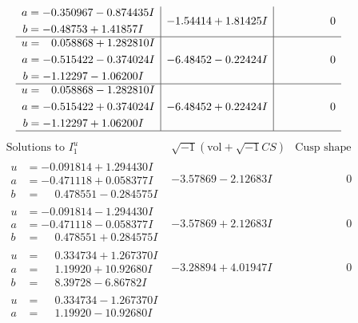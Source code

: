 \documentclass[1p]{elsarticle_modified}
\theoremstyle{definition}
\newcommand{\I}{\sqrt{-1}}
\begin{document}
$$\begin{array}{c|c|c}
\begin{aligned}
a &= -0.350967 - 0.874435 I \\
b &= -0.48753 + 1.41857 I\end{aligned}
 & -1.54414 + 1.81425 I & \phantom{-0.000000 } 0 \\ \hline\begin{aligned}
u &= \phantom{-}0.058868 + 1.282810 I \\
a &= -0.515422 - 0.374024 I \\
b &= -1.12297 - 1.06200 I\end{aligned}
 & -6.48452 - 0.22424 I & \phantom{-0.000000 } 0 \\ \hline\begin{aligned}
u &= \phantom{-}0.058868 - 1.282810 I \\
a &= -0.515422 + 0.374024 I \\
b &= -1.12297 + 1.06200 I\end{aligned}
 & -6.48452 + 0.22424 I & \phantom{-0.000000 } 0\\
 \hline 
 \end{array}$$\newpage$$\begin{array}{c|c|c}  
\text{Solutions to }I^u_{1}& \I (\text{vol} + \sqrt{-1}CS) & \text{Cusp shape}\\
 \hline 
\begin{aligned}
u &= -0.091814 + 1.294430 I \\
a &= -0.471118 + 0.058377 I \\
b &= \phantom{-}0.478551 - 0.284575 I\end{aligned}
 & -3.57869 - 2.12683 I & \phantom{-0.000000 } 0 \\ \hline\begin{aligned}
u &= -0.091814 - 1.294430 I \\
a &= -0.471118 - 0.058377 I \\
b &= \phantom{-}0.478551 + 0.284575 I\end{aligned}
 & -3.57869 + 2.12683 I & \phantom{-0.000000 } 0 \\ \hline\begin{aligned}
u &= \phantom{-}0.334734 + 1.267370 I \\
a &= \phantom{-}1.19920 + 10.92680 I \\
b &= \phantom{-}8.39728 - 6.86782 I\end{aligned}
 & -3.28894 + 4.01947 I & \phantom{-0.000000 } 0 \\ \hline\begin{aligned}
u &= \phantom{-}0.334734 - 1.267370 I \\
a &= \phantom{-}1.19920 - 10.92680 I \\

\end{aligned}
\end{array}$$
\end{document}
